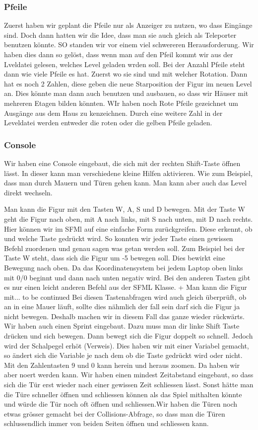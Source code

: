 \documentclass[12pt,a4paper]{scrartcl}
\begin{document}
\subsubsection{Pfeile}
Zuerst haben wir geplant die Pfeile nur als Anzeiger zu nutzen, wo dass Eingänge sind. Doch dann hatten wir die Idee, dass man sie auch gleich als Teleporter benutzen könnte. SO standen wir vor einem viel schwereren Herausforderung. Wir haben dies dann so gelöst, dass wenn man auf den Pfeil kommt wir aus der Lveldatei gelesen, welches Level geladen wrden soll. Bei der Anzahl Pfeile steht dann wie viele Pfeile es hat. Zuerst wo sie sind und mit welcher Rotation. Dann hat es noch 2 Zahlen, diese geben die neue Starposition der Figur im neuen Level an. Dies könnte man dann auch benutzen und ausbauen, so dass wir Häuser mit mehreren Etagen bilden könnten. WIr haben noch Rote Pfeile gezeichnet um Ausgänge aus dem Haus zu kenzeichnen. Durch eine weitere Zahl in der Leveldatei werden entweder die roten oder die gelben Pfeile geladen.

\subsubsection{Console}
Wir haben eine Console eingebaut, die sich mit der rechten Shift-Taste öffnen lässt. In dieser kann man verschiedene kleine Hilfen aktivieren. Wie zum Beispiel, dass man durch Mauern und Türen gehen kann. Man kann aber auch das Level direkt wechseln.

Man kann die Figur mit den Tasten W, A, S und D bewegen. Mit der Taste W geht die Figur nach oben, mit A nach links, mit S nach unten, mit D nach rechts. Hier können wir im SFMl auf eine einfache Form zurückgreifen. Diese erkennt, ob und welche Taste gedrückt wird. So konnten wir jeder Taste einen gewissen Befehl zuordenen und genau sagen was getan werden soll. Zum Beispiel bei der Taste W steht, dass sich die Figur um -5 bewegen soll. Dies bewirkt eine Bewegung nach oben. Da das Koordinatensystem bei jedem Laptop oben links mit 0/0 beginnt und dann nach unten negativ wird. Bei den anderen Tasten gibt es nur einen leicht anderen Befehl aus der SFML Klasse. 	+ Man kann die Figur mit... to be continued
Bei diesen Tastenabfragen wird auch gleich überprüft, ob an in eine Mauer läuft, sollte dies nähmlich der fall sein darf sich die Figur ja nicht bewegen. Deshalb machen wir in diesem Fall das ganze wieder rückwärts. Wir haben auch einen Sprint eingebaut. Dazu muss man dir linke Shift Taste drücken und sich bewegen. Dann bewegt sich die Figur doppelt so schnell. Jedoch wird der Schalpegel erhöt (Verweis). Dies haben wir mit einer Variabel gemacht, so ändert sich die Variable je nach dem ob die Taste gedrückt wird oder nicht. 	
Mit den Zahlentasten 9 und 0 kann herein und heraus zoomen. Da haben wir aber noert werden kann. Wir haben einen mindest Zeitabstand eingebaut, so dass sich die Tür erst wieder nach einer gewissen Zeit schliessen lässt. Sonst hätte man die Türe schneller öffnen und schliessen können als das Spiel mithalten könnte und würde die Tür noch oft öffnen und schliessen.Wir haben die Türen noch etwas grösser gemacht bei der Collisions-Abfrage, so dass man die Türen schlussendlich immer von beiden Seiten öffnen und schliessen kann. 	
 	
\end{document}
